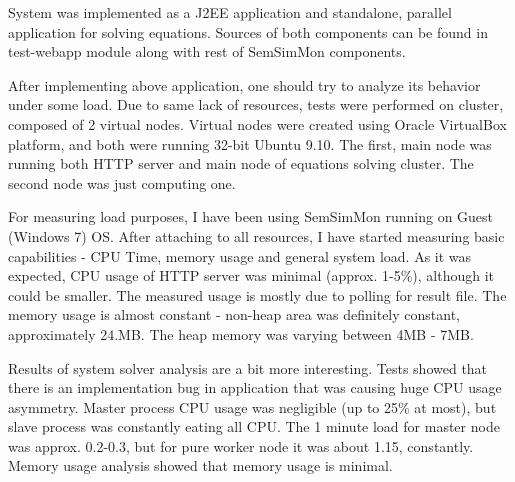 System was implemented as a J2EE application and standalone, parallel application for solving equations. Sources of both components can be found in test-webapp module along with rest of SemSimMon components.

After implementing above application, one should try to analyze its behavior under some load. Due to same lack of resources, tests were performed on cluster, composed of 2 virtual nodes. Virtual nodes were created using Oracle VirtualBox platform, and both were running 32-bit Ubuntu 9.10. The first, main node was running both HTTP server and main node of equations solving cluster. The second node was just computing one.

For measuring load purposes, I have been using SemSimMon running on Guest (Windows 7) OS. After attaching to all resources, I have started measuring basic capabilities - CPU Time, memory usage and general system load. As it was expected, CPU usage of HTTP server was minimal (approx. 1-5\%), although it could be smaller. The measured usage is mostly due to polling for result file. The memory usage is almost constant - non-heap area was definitely constant, approximately 24.MB. The heap memory was varying between 4MB - 7MB.

Results of system solver analysis are a bit more interesting. Tests showed that there is an implementation bug in application that was causing huge CPU usage asymmetry. Master process CPU usage was negligible (up to 25\% at most), but slave process was constantly eating all CPU. The 1 minute load for master node was approx. 0.2-0.3, but for pure worker node it was about 1.15, constantly. Memory usage analysis showed that memory usage is minimal. 
